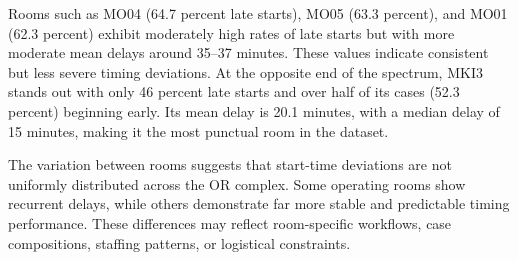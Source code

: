 \documentclass[
]{article}
\begin{document}
Rooms such as MO04 (64.7 percent late starts), MO05 (63.3 percent), and
MO01 (62.3 percent) exhibit moderately high rates of late starts but
with more moderate mean delays around 35--37 minutes. These values
indicate consistent but less severe timing deviations. At the opposite
end of the spectrum, MKI3 stands out with only 46 percent late starts
and over half of its cases (52.3 percent) beginning early. Its mean
delay is 20.1 minutes, with a median delay of 15 minutes, making it the
most punctual room in the dataset.

The variation between rooms suggests that start-time deviations are not
uniformly distributed across the OR complex. Some operating rooms show
recurrent delays, while others demonstrate far more stable and
predictable timing performance. These differences may reflect
room-specific workflows, case compositions, staffing patterns, or
logistical constraints.
\end{document}

